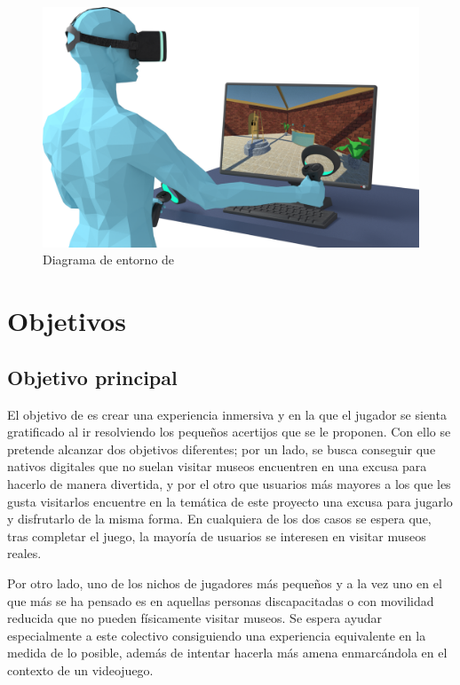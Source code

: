 \vspace{0.4cm}

\begin{figure}[!h]
\begin{center}
\includegraphics[width=1\textwidth]{imagenes/1/entorno-diffuse-2.png}
\caption{Diagrama de entorno de \MineRVa}
\label{fig:entorno}
\end{center}
\end{figure}

\section{Objetivos}

\subsection{Objetivo principal}

El objetivo de \MineRVa es crear una experiencia inmersiva y en la que el jugador se sienta gratificado al ir resolviendo los pequeños acertijos que se le proponen. Con ello se pretende alcanzar dos objetivos diferentes; por un lado, se busca conseguir que nativos digitales que no suelan visitar museos encuentren en \MineRVa una excusa para hacerlo de manera divertida, y por el otro que usuarios más mayores a los que les gusta visitarlos encuentre en la temática de este proyecto una excusa para jugarlo y disfrutarlo de la misma forma. En cualquiera de los dos casos se espera que, tras completar el juego, la mayoría de usuarios se interesen en visitar museos reales.

Por otro lado, uno de los nichos de jugadores más pequeños y a la vez uno en el que más se ha pensado es en aquellas personas discapacitadas o con movilidad reducida que no pueden físicamente visitar museos. Se espera ayudar especialmente a este colectivo consiguiendo una experiencia equivalente en la medida de lo posible, además de intentar hacerla más amena enmarcándola en el contexto de un videojuego.

